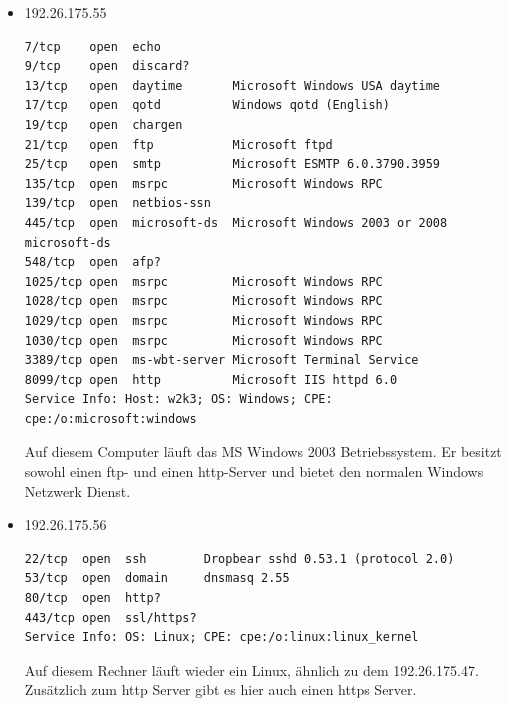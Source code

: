 \documentclass[10pt,a4paper]{article}
\begin{document}
\begin{itemize}
\item 192.26.175.55
\begin{verbatim}
7/tcp    open  echo
9/tcp    open  discard?
13/tcp   open  daytime       Microsoft Windows USA daytime
17/tcp   open  qotd          Windows qotd (English)
19/tcp   open  chargen
21/tcp   open  ftp           Microsoft ftpd
25/tcp   open  smtp          Microsoft ESMTP 6.0.3790.3959
135/tcp  open  msrpc         Microsoft Windows RPC
139/tcp  open  netbios-ssn
445/tcp  open  microsoft-ds  Microsoft Windows 2003 or 2008 microsoft-ds
548/tcp  open  afp?
1025/tcp open  msrpc         Microsoft Windows RPC
1028/tcp open  msrpc         Microsoft Windows RPC
1029/tcp open  msrpc         Microsoft Windows RPC
1030/tcp open  msrpc         Microsoft Windows RPC
3389/tcp open  ms-wbt-server Microsoft Terminal Service
8099/tcp open  http          Microsoft IIS httpd 6.0
Service Info: Host: w2k3; OS: Windows; CPE: cpe:/o:microsoft:windows
\end{verbatim}
Auf diesem Computer läuft das MS Windows 2003 Betriebssystem. Er besitzt sowohl einen ftp- und einen http-Server und bietet den normalen Windows Netzwerk Dienst.

\item 192.26.175.56
\begin{verbatim}
22/tcp  open  ssh        Dropbear sshd 0.53.1 (protocol 2.0)
53/tcp  open  domain     dnsmasq 2.55
80/tcp  open  http?
443/tcp open  ssl/https?
Service Info: OS: Linux; CPE: cpe:/o:linux:linux_kernel
\end{verbatim}
Auf diesem Rechner läuft wieder ein Linux, ähnlich zu dem 192.26.175.47. Zusätzlich zum http Server gibt es hier auch einen https Server.


\end{itemize}
\end{document}
